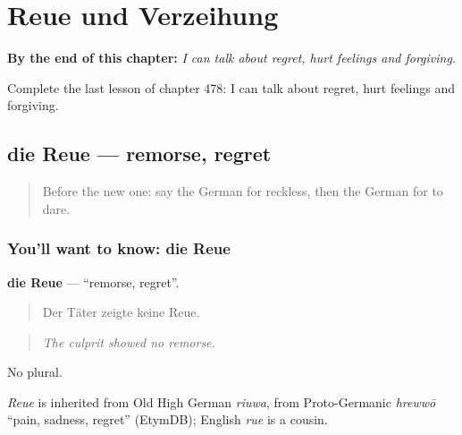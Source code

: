
\chapter{Reue und Verzeihung}
\label{ch:ge-reue-und-verzeihung}

\begin{chapteropening}
\textbf{By the end of this chapter:} \emph{I can talk about regret, hurt feelings and forgiving.}

Complete the last lesson of chapter 478: I can talk about regret, hurt feelings and forgiving.
\end{chapteropening}

\section[die Reue]{die Reue — remorse, regret}

\label{lesson:GE-C478-reue}



\begin{quote}
Before the new one: say the German for reckless, then the German for to dare.
\end{quote}

\subsection*{You'll want to know: die Reue}
\textbf{die Reue} — \textquotedblleft{}remorse, regret\textquotedblright{}.

\begin{quote}
Der Täter zeigte keine Reue.
\end{quote}

\begin{quote}
\emph{The culprit showed no remorse.}
\end{quote}

No plural.

\begin{cousinweb}
\emph{Reue} is inherited from Old High German \emph{riuwa}, from Proto-Germanic \emph{hrewwō} \textquotedblleft{}pain, sadness, regret\textquotedblright{} (EtymDB); English \emph{rue} is a cousin.
\end{cousinweb}

